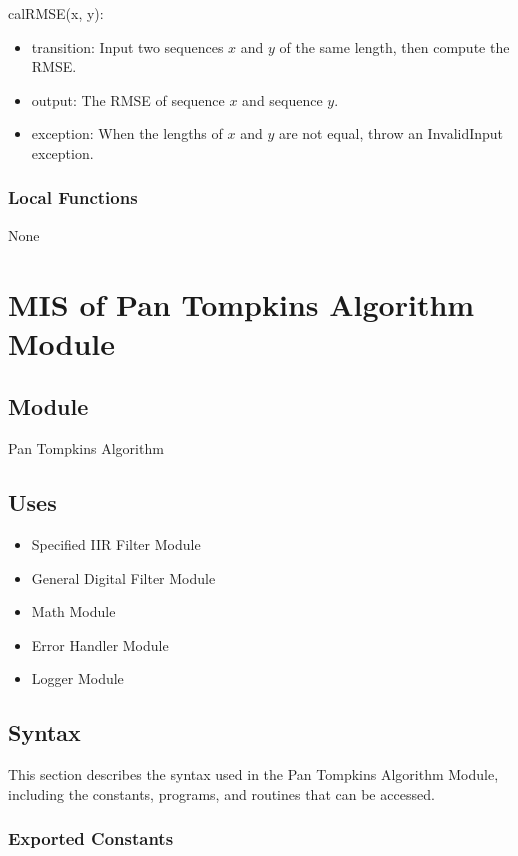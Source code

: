 \documentclass[12pt, titlepage]{article}
\begin{document}
\noindent calRMSE(x, y):
\begin{itemize}
\item transition: Input two sequences $x$ and $y$ of the same length, then
compute the RMSE.
\item output: The RMSE of sequence $x$ and sequence $y$.
\item exception: When the lengths of $x$ and $y$ are not equal, throw an
InvalidInput exception.
\end{itemize}

\subsubsection{Local Functions}

None

\newpage

\section{MIS of Pan Tompkins Algorithm Module} \label{MIS_Alg}

\subsection{Module}

Pan Tompkins Algorithm

\subsection{Uses}

\begin{itemize}
\item Specified IIR Filter Module
\item General Digital Filter Module
\item Math Module
\item Error Handler Module
\item Logger Module
\end{itemize}

\subsection{Syntax}

This section describes the syntax used in the Pan Tompkins Algorithm Module,
including the constants, programs, and routines that can be accessed.

\subsubsection{Exported Constants}
\end{document}
